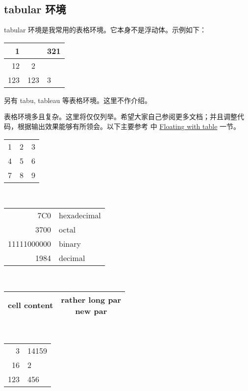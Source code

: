 \subsection{tabular 环境}
tabular 环境是我常用的表格环境。它本身不是浮动体。示例如下：
\begin{sidelst}
\begin{tabular}{|r|c|l|}
\cline{1-1} \cline{3-3}
1 & & 321 \\ \hline
12 & 2 \\ \hline
123 & 123 & 3 \\ \hline
\end{tabular}
\end{sidelst}
另有 tabu, tableau 等表格环境。这里不作介绍。

表格环境多且复杂。这里将仅仅列举。希望大家自己参阅更多文档；并且调整代码，根据输出效果能够有所领会。以下主要参考 \cite{wiki:tables} 中 \href{https://en.wikibooks.org/wiki/LaTeX/Tables\#Floating\_with\_table}{Floating with table} 一节。
\begin{sidelst}
\centering     %
\begin{tabular}{r | l c}  %
1 & 2 & 3 \\              %
4 & 5 & 6 \\
7 & 8 & 9 \\ \hline       %
\end{tabular}
\\[1cm]
\begin{tabular}{|r|l|}    %
\hline
7C0 & hexadecimal \\
3700 & octal \\ \cline{2-2} %
11111000000 & binary \\
\hline \hline
1984 & decimal \\ \hline
\end{tabular}
\\[1cm]
\begin{tabular}{cc}
\hline %
cell content & \parbox[t]{2.cm}{rather long par\\new par}
\\ \hline
\end{tabular}
\\[1cm]
\begin{tabular}{r@{.}l} %
\hline
3   & 14159 \\
16  & 2     \\
123 & 456   \\ \hline
\end{tabular}
\end{sidelst}

